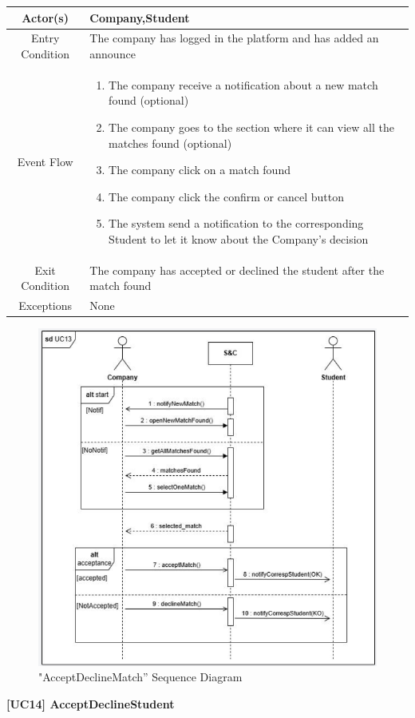 \documentclass{article}
\begin{document}
\begin{table}[H]
    \centering
    \begin{tabular}{|c|p{10cm}|}
    \hline
        Actor(s)  & Company,Student\\ 
    \hline
        Entry Condition &  
        The company has logged in the platform and has added an announce\\
    \hline
        Event Flow &
        \begin{enumerate}
            \item The company receive a notification about a new match found  (optional)
            \item The company goes to the section where it can view all the matches found (optional)
            \item The company click on a match found 
            \item The company click the confirm or cancel button 
            \item The system send a notification to the corresponding Student to let it know about the Company's decision
        \end{enumerate}
        \\
    \hline
        Exit Condition & The company has accepted or declined the student after the match found\\
    \hline
        Exceptions &  None\\
    \hline
    \end{tabular}
    \label{tab:my_label}
\end{table}
\begin{figure}[H]
    \centering
    \includegraphics[width=1\linewidth]{sequenceDiagrams/UC13.png}
    \caption{"AcceptDeclineMatch” Sequence Diagram}
    \label{fig:enter-label}
\end{figure}
\vspace{1cm}
\textbf{[UC14] AcceptDeclineStudent}
\end{document}
